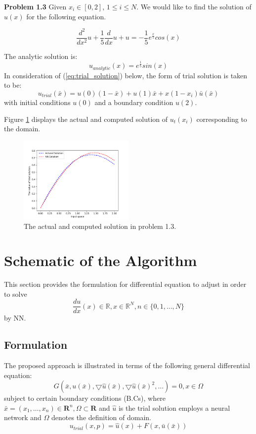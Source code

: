 \documentclass{article}
\begin{document}
\medskip \noindent
\textbf{Problem 1.3} Given $x_i \in [0,2]$, $1 \leq i \leq N$. We would like to find the solution of $u(x)$ for the following equation.

\[\frac{d^2}{dx^2} u + \frac{1}{5} \frac{d}{dx} u + u= -\frac{1}{5}e^{\frac{x}{5}}cos(x)\]

\medskip \noindent
The analytic solution is:
\[u_{analytic}(x) = e^{\frac{1}{5}}sin(x) \]
In consideration of (\ref{eq:trial_solution}) below, the form of trial solution is taken to be:
\[u_{trial}(\bar{x}) = u(0)(1-\bar{x})+ u(1)\bar{x}+x(1-x_i)\bar{u}(\bar{x})\] with initial conditions $u(0)$ and a boundary condition $u(2)$.

\medspace \noindent
Figure \ref{fig:trial_ode3} displays the actual and computed solution of $u _t(x_i)$ corresponding to the domain.

\begin{figure}
	\centering
	\includegraphics[width=0.5\textwidth]{ode_3.png}
	\caption{The actual and computed solution in problem 1.3. }
	\label{fig:trial_ode3}
\end{figure}

\section{Schematic of the Algorithm}

This section provides the formulation for differential equation to adjust in order to solve 
\[\frac{du}{dx}(x) \in \mathbb{R}, x \in \mathbb{R}^N, n\in\{0,1, \dots , N\}\]
by NN.

\subsection{Formulation}

The proposed approach is illustrated in terms of the following general differential equation:
\begin{equation}\label{eq:original_error}
G(\bar{x},u (\bar{x}),\bigtriangledown \hat{u} (\bar{x}), \bigtriangledown \hat{u} (\bar{x})^2, \dots) = 0, x \in \Omega
\end{equation}
\medskip \noindent
subject to certain boundary conditions (B.Cs),  where $ \bar{x}=(x_1, \dots , x_n) \in \mathbf{R}^n, \Omega \subset \mathbf{R}$ and $\hat{u}$ is the trial solution employs a neural network and $\Omega$ denotes the definition of domain.
\begin{equation}\label{eq:trial_solution}
u_{trial}(x,p) = \hat{u}(x) + F(x,\bar{u}(\bar{x}))
\end{equation}
\end{document}
